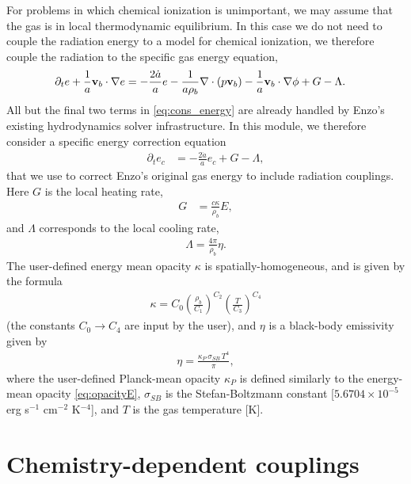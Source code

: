 \documentclass[letterpaper,10pt]{article}
\renewcommand{\(}{\left(}
\renewcommand{\)}{\right)}
\newcommand{\vb}{{\bf v}_b}
\newcommand{\rhob}{\rho_b}
\begin{document}
For problems in which chemical ionization is unimportant, we may
assume that the gas is in local thermodynamic equilibrium.  In this
case we do not need to couple the radiation energy to a model for
chemical ionization, we therefore couple the radiation to the specific
gas energy equation, 
\begin{align}
  \label{eq:cons_energy}
  \partial_t e + \frac1a\vb\cdot\nabla e &=
    - \frac{2\dot{a}}{a}e
    - \frac{1}{a\rhob}\nabla\cdot\left(p\vb\right) 
    - \frac1a\vb\cdot\nabla\phi + G - \Lambda.
\end{align}
All but the final two terms in \eqref{eq:cons_energy} are already
handled by Enzo's existing hydrodynamics solver infrastructure.  In
this module, we therefore consider a specific energy correction equation 
\begin{align}
  \label{eq:cons_energy_correction}
  \partial_t e_c &= -\frac{2\dot{a}}{a}e_c + G - \Lambda,
\end{align}
that we use to correct Enzo's original gas energy to include radiation
couplings.  Here $G$ is the local heating rate,
\begin{align}
\label{eq:G_LTE}
  G &= \frac{c \kappa}{\rhob} E,
\end{align}
and $\Lambda$ corresponds to the local cooling rate,
\begin{align}
\label{eq:Lambda_LTE}
  \Lambda = \frac{4\pi}{\rhob} \eta.
\end{align}
The user-defined energy mean opacity $\kappa$ is
spatially-homogeneous, and is given by the formula
\begin{align}
\label{eq:opacityE}
  \kappa = C_0 \left(\frac{\rhob}{C_1}\right)^{C_2}
    \left(\frac{T}{C_3}\right)^{C_4} 
\end{align}
(the constants $C_0\to C_4$ are input by the user), and $\eta$ is
a black-body emissivity given by 
\begin{align}
\label{eq:etaBB}
  \eta = \frac{\kappa_P\,\sigma_{SB}\,T^4}{\pi},
\end{align}
where the user-defined Planck-mean opacity $\kappa_P$ is defined
similarly to the energy-mean opacity \eqref{eq:opacityE},
$\sigma_{SB}$ is the Stefan-Boltzmann constant [$5.6704\times 10^{-5}$
erg s$^{-1}$ cm$^{-2}$ K$^{-4}$], and $T$ is the gas temperature [K].



\section{Chemistry-dependent couplings}
\label{sec:chem_model}
\end{document}
